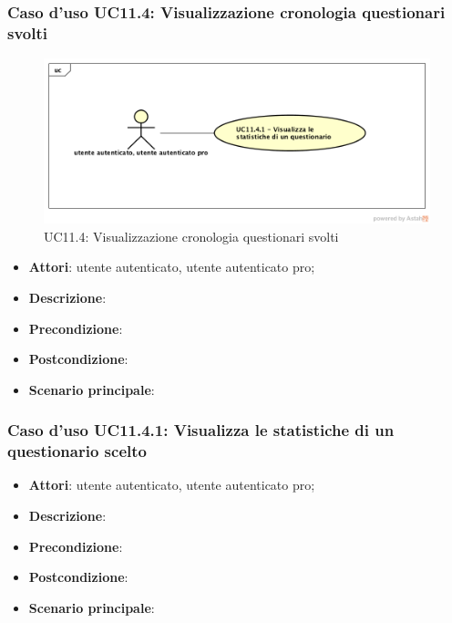 \subsubsection{Caso d'uso UC11.4: Visualizzazione cronologia questionari svolti}
\label{UC11.4}
\begin{figure}[h]
	\centering
	\includegraphics[scale=0.5]{UML/UC11_4.png}
	\caption{UC11.4: Visualizzazione cronologia questionari svolti}
\end{figure}
\begin{itemize}
\item\textbf{Attori}: utente autenticato, utente autenticato pro;
\item\textbf{Descrizione}: 
\item\textbf{Precondizione}:
\item\textbf{Postcondizione}: 
\item\textbf{Scenario principale}: 
\end{itemize}

\subsubsection{Caso d'uso UC11.4.1: Visualizza le statistiche di un questionario scelto}
\begin{itemize}
\item\textbf{Attori}: utente autenticato, utente autenticato pro;
\item\textbf{Descrizione}: 
\item\textbf{Precondizione}:
\item\textbf{Postcondizione}: 
\item\textbf{Scenario principale}: 
\end{itemize}

